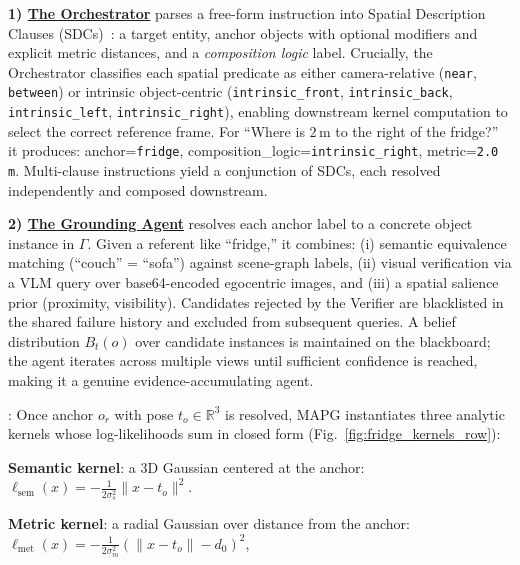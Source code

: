 
\noindent$\!\!$\textbf{1) \uline{The Orchestrator}} parses a free-form instruction into Spatial Description Clauses (SDCs)~\cite{kollar2010toward}: a target entity, anchor objects with optional modifiers and explicit metric distances, and a \emph{composition logic} label. Crucially, the Orchestrator classifies each spatial predicate as either camera-relative (\texttt{near}, \texttt{between}) or intrinsic object-centric (\texttt{intrinsic\_front}, \texttt{intrinsic\_back}, \texttt{intrinsic\_left}, \texttt{intrinsic\_right}), enabling downstream kernel computation to select the correct reference frame. For ``Where is $2\,\mathrm{m}$ to the right of the fridge?'' it produces: anchor=\texttt{fridge}, composition\_logic=\texttt{intrinsic\_right}, metric=\texttt{2.0\,m}. Multi-clause instructions yield a conjunction of SDCs, each resolved independently and composed downstream.

\noindent$\!\!$\textbf{2) \uline{The Grounding Agent}} resolves each anchor label to a concrete object instance in $\Gamma$. Given a referent like ``fridge,'' it combines: (i) semantic equivalence matching (``couch'' = ``sofa'') against scene-graph labels, (ii) visual verification via a VLM query over base64-encoded egocentric images, and (iii) a spatial salience prior (proximity, visibility). Candidates rejected by the Verifier are blacklisted in the shared failure history and excluded from subsequent queries. A belief distribution $B_t(o)$ over candidate instances is maintained on the blackboard; the agent iterates across multiple views until sufficient confidence is reached, making it a genuine evidence-accumulating agent.

: Once anchor $o_r$ with pose $t_o \in \mathbb{R}^3$ is resolved, MAPG instantiates three analytic kernels whose log-likelihoods sum in closed form (Fig.~\ref{fig:fridge_kernels_row}):

\noindent\textbf{Semantic kernel}: a $3$D Gaussian centered at the anchor: $\ell_{\text{sem}}(x) = -\tfrac{1}{2\sigma_s^2}\|x - t_o\|^2$.

\noindent\textbf{Metric kernel}: a radial Gaussian over distance from the anchor: $\ell_{\text{met}}(x) = -\tfrac{1}{2\sigma_m^2}(\|x-t_o\| - d_0)^2$, 

